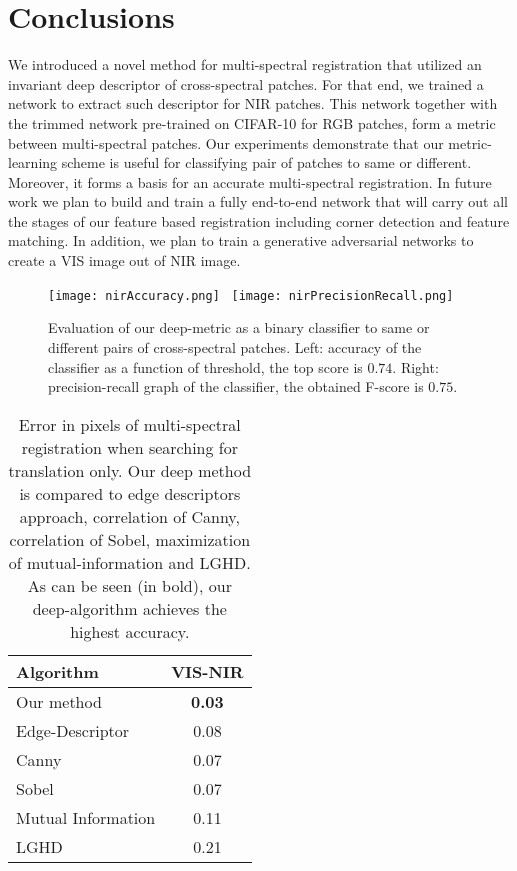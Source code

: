 \documentclass[10pt,twocolumn,letterpaper]{article}
\begin{document}
\section{Conclusions} \label{sec:conclusions}

We introduced a novel method for multi-spectral registration that utilized an invariant deep descriptor of cross-spectral patches. For that end, we trained a network to extract such descriptor for NIR patches. This network together with the trimmed network pre-trained on CIFAR-10 for RGB patches, form a metric between multi-spectral patches. Our experiments demonstrate that our metric-learning scheme is useful for classifying pair of patches to same or different. Moreover, it forms a basis for an accurate multi-spectral registration. In future work we plan to build and train a fully end-to-end network that will carry out all the stages of our feature based registration including corner detection and feature matching. In addition, we plan to train a generative adversarial networks to create a VIS image out of NIR image. 

\begin{figure}
	\centering
	\texttt{[image: nirAccuracy.png]}~
	\texttt{[image: nirPrecisionRecall.png]}	
	\caption{Evaluation of our deep-metric as a binary classifier to same or different pairs of cross-spectral patches. Left: accuracy of the classifier as a function of threshold, the top score is $0.74$. Right: precision-recall graph of the classifier, the obtained F-score is $0.75$.}
	\label{fig:3}       %
\end{figure}


\begin{table}
	\centering
	\begin{tabular}{ l | c }
		Algorithm & VIS-NIR \\
		\hline
		Our method & \textbf{0.03} \\
		Edge-Descriptor & 0.08 \\
		Canny & 0.07 \\
		Sobel & 0.07 \\
		Mutual Information & 0.11 \\
		LGHD & 0.21
	\end{tabular}
	\caption{Error in pixels of multi-spectral registration when searching for translation only. Our deep method is compared to edge descriptors approach, correlation of Canny, correlation of Sobel, maximization of mutual-information and LGHD. As can be seen (in bold), our deep-algorithm achieves the highest accuracy.}
	\label{table:2}
\end{table}
\end{document}

